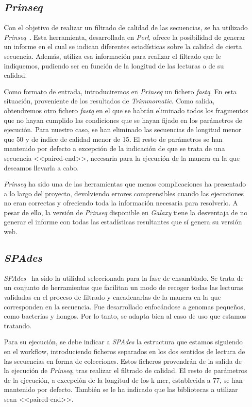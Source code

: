 \subsection{\itshape{Prinseq}}
Con el objetivo de realizar un filtrado de calidad de las secuencias, se ha utilizado \textit{Prinseq}~\cite{schmieder_prinseq}. Esta herramienta, desarrollada en \textit{Perl}, ofrece la posibilidad de generar un informe en el cual se indican diferentes estadísticas sobre la calidad de cierta secuencia. Además, utiliza esa información para realizar el filtrado que le indiquemos, pudiendo ser en función de la longitud de las lecturas o de su calidad.

Como formato de entrada, introduciremos en \textit{Prinseq} un fichero \textit{fastq}. En esta situación, proveniente de los resultados de \textit{Trimmomatic}. Como salida, obtendremos otro fichero \textit{fastq} en el que se habrán eliminado todos los fragmentos que no hayan cumplido las condiciones que se hayan fijado en los parámetros de ejecución. Para nuestro caso, se han eliminado las secuencias de longitud menor que 50 y de índice de calidad menor de 15. El resto de parámetros se han mantenido por defecto a excepción de la indicación de que se trata de una secuencia <<paired-end>>, necesaria para la ejecución de la manera en la que deseamos llevarla a cabo.

\textit{Prinseq} ha sido una de las herramientas que menos complicaciones ha presentado a lo largo del proyecto, devolviendo errores comprensibles cuando las ejecuciones no eran correctas y ofreciendo toda la información necesaria para resolverlo. A pesar de ello, la versión de \textit{Prinseq} disponible en \textit{Galaxy} tiene la desventaja de no generar el informe con todas las estadísticas resultantes que sí genera su versión web.

\subsection{\itshape{SPAdes}}
\textit{SPAdes}~\cite{Nurk2013} ha sido la utilidad seleccionada para la fase de ensamblado. Se trata de un conjunto de herramientas que facilitan un modo de recoger todas las lecturas validadas en el proceso de filtrado y encadenarlas de la manera en la que corresponden en la secuencia. Fue desarrollado enfocándose a genomas pequeños, como bacterias y hongos. Por lo tanto, se adapta bien al caso de uso que estamos tratando.

Para su ejecución, se debe indicar a \textit{SPAdes} la estructura que estamos siguiendo en el workflow, introduciendo ficheros separados en los dos sentidos de lectura de las secuencias en forma de colecciones. Estos ficheros provendrán de la salida de la ejecución de \textit{Prinseq}, tras realizar el filtrado de calidad. El resto de parámetros de la ejecución, a excepción de la longitud de los k-mer, establecida a 77, se han mantenido por defecto. También se le ha indicado que las bibliotecas a utilizar sean <<paired-end>>.

